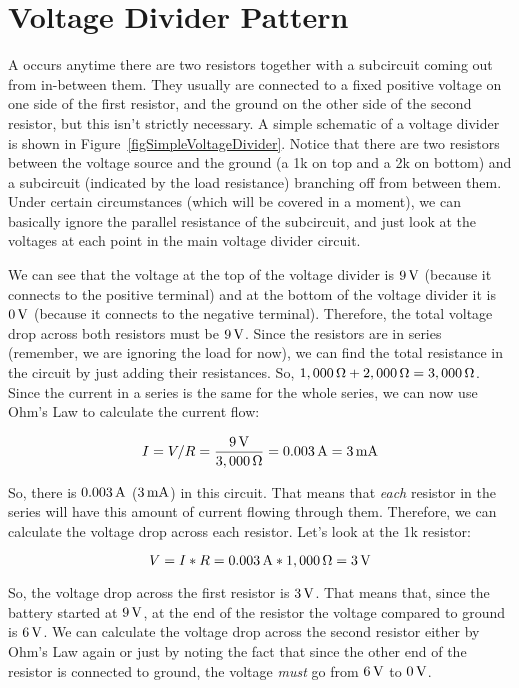 \section{Voltage Divider Pattern}


A  occurs anytime there are two resistors together with a subcircuit coming out from in-between them.
They usually are connected to a fixed positive voltage on one side of the first resistor, and the ground on the other side of the second resistor, but this isn't strictly necessary.
A simple schematic of a voltage divider is shown in Figure~\ref{figSimpleVoltageDivider}.
Notice that there are two resistors between the voltage source and the ground (a 1k on top and a 2k on bottom) and a subcircuit (indicated by the load resistance) branching off from between them.
Under certain circumstances (which will be covered in a moment), we can basically ignore the parallel resistance of the subcircuit, and just look at the voltages at each point in the main voltage divider circuit.

We can see that the voltage at the top of the voltage divider is $9\,\si{\volt}$ (because it connects to the positive terminal) and at the bottom of the voltage divider it is $0\,\si{\volt}$ (because it connects to the negative terminal).  
Therefore, the total voltage drop across both resistors must be $9\,\si{\volt}$.
Since the resistors are in series (remember, we are ignoring the load for now), we can find the total resistance in the circuit by just adding their resistances.
So, $1,000\,\si{\ohm} + 2,000\,\si{\ohm} = 3,000\,\si{\ohm}$.
Since the current in a series is the same for the whole series, we can now use Ohm's Law to calculate the current flow:

$$ I = V / R = \frac{9\,\si{\volt}}{3,000\,\si{\ohm}} = 0.003\,\si{\ampere} = 3\,\si{\milli\ampere} $$

So, there is $0.003\,\si{\ampere}$ ($3\,\si{\milli\ampere}$) in this circuit.
That means that \emph{each} resistor in the series will have this amount of current flowing through them.
Therefore, we can calculate the voltage drop across each resistor.
Let's look at the 1k resistor:

$$ V = I * R = 0.003\,\si{\ampere} * 1,000\,\si{\ohm} = 3\,\si{\volt} $$

So, the voltage drop across the first resistor is $3\,\si{\volt}$.
That means that, since the battery started at $9\,\si{\volt}$, at the end of the resistor the voltage compared to ground is $6\,\si{\volt}$.
We can calculate the voltage drop across the second resistor either by Ohm's Law again or just by noting the fact that since the other end of the resistor is connected to ground, the voltage \emph{must} go from $6\,\si{\volt}$ to $0\,\si{\volt}$.

